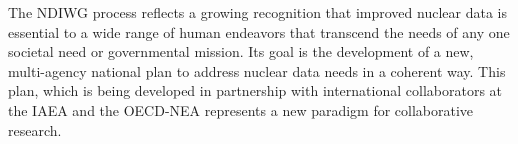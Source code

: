 \documentclass[letterpaper,draft]{ar-1col}
\begin{document}
The NDIWG process reflects a growing recognition that improved nuclear data is essential to a wide range of human endeavors that transcend the needs of any one societal need or governmental mission.  Its goal is the development of a new, multi-agency national plan to address nuclear data needs in a coherent way.  This plan, which is being developed in partnership with international collaborators at the IAEA and the OECD-NEA represents a new paradigm for collaborative research.  
% 
% 
% 
\end{document}
